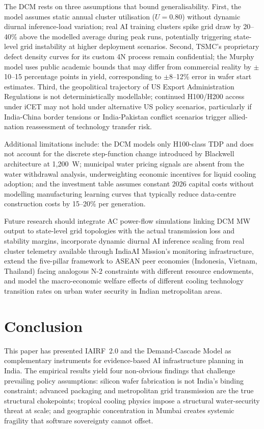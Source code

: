 \documentclass[conference]{IEEEtran}
\begin{document}
The DCM rests on three assumptions that bound generalisability. First, the model assumes static annual cluster utilisation ($U = 0.80$) without dynamic diurnal inference-load variation; real AI training clusters spike grid draw by 20--40\% above the modelled average during peak runs, potentially triggering state-level grid instability at higher deployment scenarios. Second, TSMC's proprietary defect density curves for its custom 4N process remain confidential; the Murphy model uses public academic bounds that may differ from commercial reality by $\pm$10--15 percentage points in yield, corresponding to $\pm$8--12\% error in wafer start estimates. Third, the geopolitical trajectory of US Export Administration Regulations is not deterministically modellable; continued H100/H200 access under iCET may not hold under alternative US policy scenarios, particularly if India-China border tensions or India-Pakistan conflict scenarios trigger allied-nation reassessment of technology transfer risk.

Additional limitations include: the DCM models only H100-class TDP and does not account for the discrete step-function change introduced by Blackwell architecture at 1{,}200~W; municipal water pricing signals are absent from the water withdrawal analysis, underweighting economic incentives for liquid cooling adoption; and the investment table assumes constant 2026 capital costs without modelling manufacturing learning curves that typically reduce data-centre construction costs by 15--20\% per generation.

Future research should integrate AC power-flow simulations linking DCM MW output to state-level grid topologies with the actual transmission loss and stability margins, incorporate dynamic diurnal AI inference scaling from real cluster telemetry available through IndiaAI Mission's monitoring infrastructure, extend the five-pillar framework to ASEAN peer economies (Indonesia, Vietnam, Thailand) facing analogous N-2 constraints with different resource endowments, and model the macro-economic welfare effects of different cooling technology transition rates on urban water security in Indian metropolitan areas.

\section{Conclusion}

This paper has presented IAIRF~2.0 and the Demand-Cascade Model as complementary instruments for evidence-based AI infrastructure planning in India. The empirical results yield four non-obvious findings that challenge prevailing policy assumptions: silicon wafer fabrication is not India's binding constraint; advanced packaging and metropolitan grid transmission are the true structural chokepoints; tropical cooling physics impose a structural water-security threat at scale; and geographic concentration in Mumbai creates systemic fragility that software sovereignty cannot offset.
\end{document}
